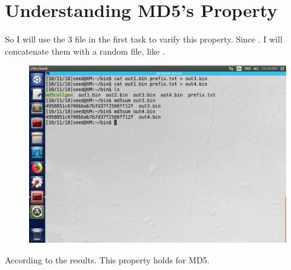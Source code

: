 \documentclass{article}
\begin{document}
\section{Understanding MD5's Property}
So I will use the 3 file in the first task to varify this property. Since . I will concatenate them with a random file, like .
\begin{figure}[H]\centering\includegraphics[width=\textwidth]{ss/08.png}\end{figure}
According to the  results. This property holds for MD5.
\end{document}
